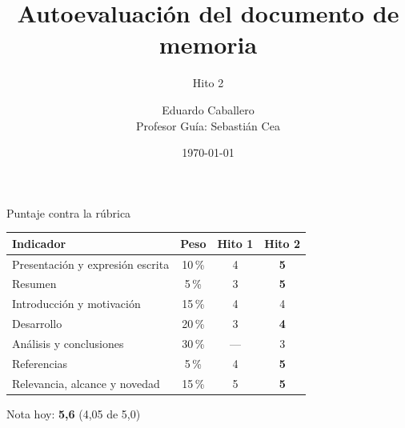 \documentclass[aspectratio=169]{beamer}
\title[Autoevaluación Hito 2]{Autoevaluación del documento de memoria}
\subtitle{Hito 2}
\author[Eduardo Caballero]{Eduardo Caballero \\ \small{Profesor Guía: Sebastián Cea}}
\institute{Universidad de los Andes}
\date{\today}
\begin{document}
\frame{\titlepage}

\begin{frame}{Puntaje contra la rúbrica}

\begin{table}
\centering
\begin{tabular}{lccc}
\toprule
Indicador & Peso & Hito 1 & \textbf{Hito 2} \\
\midrule
Presentación y expresión escrita & 10\,\% & 4 & \textbf{5} \\
Resumen                          & 5\,\%  & 3 & \textbf{5} \\
Introducción y motivación        & 15\,\% & 4 & 4 \\
Desarrollo                       & 20\,\% & 3 & \textbf{4} \\
Análisis y conclusiones          & 30\,\% & --- & 3 \\
Referencias                      & 5\,\%  & 4 & \textbf{5} \\
Relevancia, alcance y novedad    & 15\,\% & 5 & \textbf{5} \\
\bottomrule
\end{tabular}
\end{table}

\vfill
\begin{block}{}
\centering
Nota hoy: \textbf{\textcolor{SafeGreen}{5,6}} \quad (4,05 de 5,0)
\end{block}

\end{frame}
\end{document}
